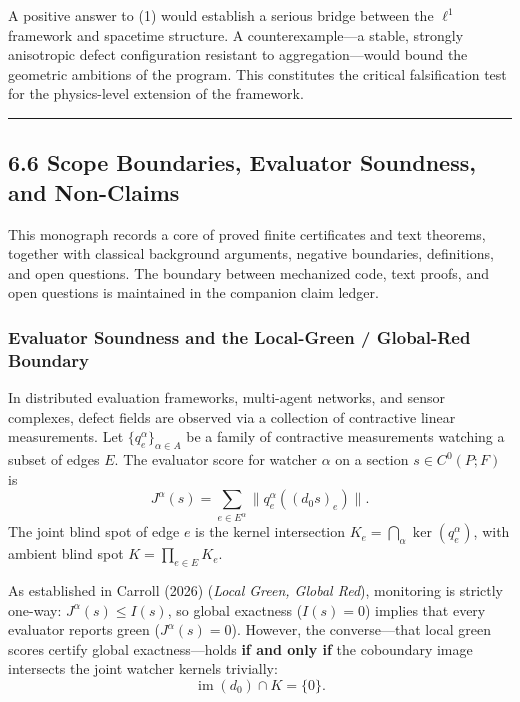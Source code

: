 \documentclass[
]{article}
\begin{document}
A positive answer to (1) would establish a serious bridge between the \(\ell^1\) framework and spacetime structure. A counterexample---a stable, strongly anisotropic defect configuration resistant to aggregation---would bound the geometric ambitions of the program. This constitutes the critical falsification test for the physics-level extension of the framework.

\begin{center}\rule{0.5\linewidth}{0.5pt}\end{center}

\subsection{6.6 Scope Boundaries, Evaluator Soundness, and Non-Claims}\label{scope-boundaries-evaluator-soundness-and-non-claims}

This monograph records a core of proved finite certificates and text theorems, together with classical background arguments, negative boundaries, definitions, and open questions. The boundary between mechanized code, text proofs, and open questions is maintained in the companion claim ledger.

\subsubsection{Evaluator Soundness and the Local-Green / Global-Red Boundary}\label{evaluator-soundness-and-the-local-green-global-red-boundary}

In distributed evaluation frameworks, multi-agent networks, and sensor complexes, defect fields are observed via a collection of contractive linear measurements. Let \(\{q_e^\alpha\}_{\alpha \in A}\) be a family of contractive measurements watching a subset of edges \(E\). The evaluator score for watcher \(\alpha\) on a section \(s \in C^0(P; F)\) is
\[J^\alpha(s) = \sum_{e \in E^\alpha} \|q_e^\alpha((d_0 s)_e)\|.\]
The joint blind spot of edge \(e\) is the kernel intersection \(K_e = \bigcap_{\alpha} \ker(q_e^\alpha)\), with ambient blind spot \(K = \prod_{e \in E} K_e\).

As established in Carroll (2026) (\emph{Local Green, Global Red}), monitoring is strictly one-way: \(J^\alpha(s) \le I(s)\), so global exactness (\(I(s) = 0\)) implies that every evaluator reports green (\(J^\alpha(s) = 0\)). However, the converse---that local green scores certify global exactness---holds \textbf{if and only if} the coboundary image intersects the joint watcher kernels trivially:
\[\operatorname{im}(d_0) \cap K = \{0\}.\]
\end{document}
